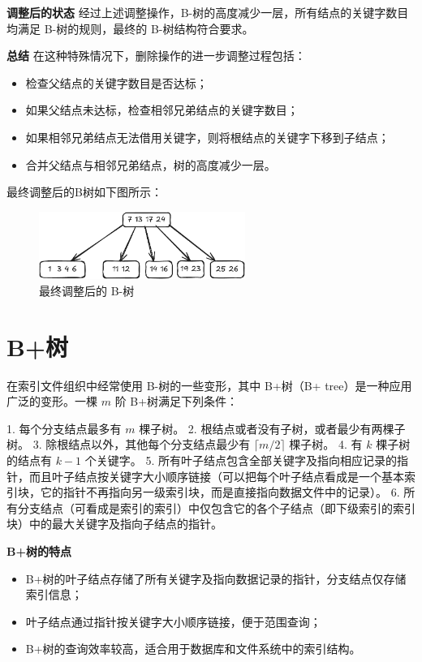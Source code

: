\documentclass[lang=cn,newtx,10pt,scheme=chinese]{../elegantbook}
\begin{document}
\textbf{调整后的状态}  
经过上述调整操作，B-树的高度减少一层，所有结点的关键字数目均满足 B-树的规则，最终的 B-树结构符合要求。


\textbf{总结}  
在这种特殊情况下，删除操作的进一步调整过程包括：
\begin{itemize}
  \item 检查父结点的关键字数目是否达标；
  \item 如果父结点未达标，检查相邻兄弟结点的关键字数目；
  \item 如果相邻兄弟结点无法借用关键字，则将根结点的关键字下移到子结点；
  \item 合并父结点与相邻兄弟结点，树的高度减少一层。
\end{itemize}

最终调整后的B树如下图所示：

\begin{figure}[!htbp]
    \centering
    \includegraphics[width=0.6\textwidth]{./figure/pdf/cropped/Btree_del6.pdf}
    \caption{最终调整后的 B-树}
    \label{fig:Btree_final}

\end{figure}
\section{B+树}
在索引文件组织中经常使用 B-树的一些变形，其中 B+树（B+ tree）是一种应用广泛的变形。一棵 $m$ 阶 B+树满足下列条件：

1. 每个分支结点最多有 $m$ 棵子树。
2. 根结点或者没有子树，或者最少有两棵子树。
3. 除根结点以外，其他每个分支结点最少有 $\lceil m/2 \rceil$ 棵子树。
4. 有 $k$ 棵子树的结点有 $k-1$ 个关键字。
5. 所有叶子结点包含全部关键字及指向相应记录的指针，而且叶子结点按关键字大小顺序链接（可以把每个叶子结点看成是一个基本索引块，它的指针不再指向另一级索引块，而是直接指向数据文件中的记录）。
6. 所有分支结点（可看成是索引的索引）中仅包含它的各个子结点（即下级索引的索引块）中的最大关键字及指向子结点的指针。


\textbf{B+树的特点}  
\begin{itemize}
  \item B+树的叶子结点存储了所有关键字及指向数据记录的指针，分支结点仅存储索引信息；
  \item 叶子结点通过指针按关键字大小顺序链接，便于范围查询；
  \item B+树的查询效率较高，适合用于数据库和文件系统中的索引结构。
\end{itemize}
\end{document}
